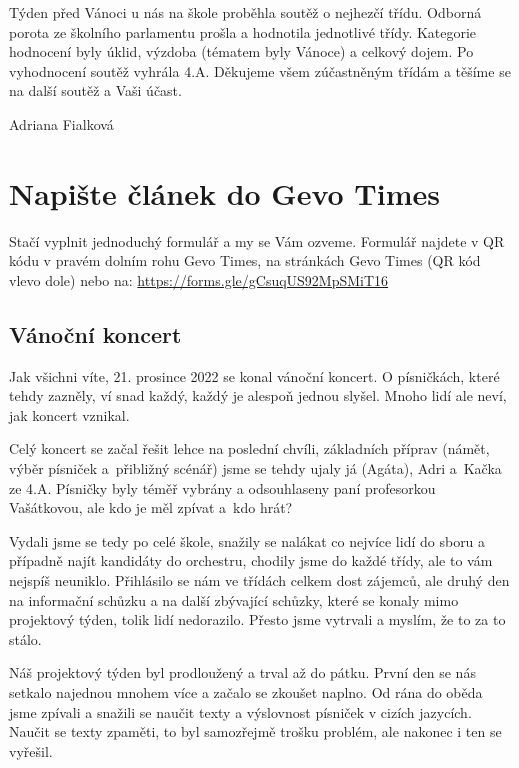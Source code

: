 \documentclass[12pt, a4paper]{article}
\begin{document}
\begin{multicols*}{2}
        Týden před Vánoci u nás na škole proběhla soutěž o nejhezčí třídu. Odborná porota ze školního parlamentu prošla a hodnotila jednotlivé třídy. Kategorie hodnocení byly úklid, výzdoba (tématem byly Vánoce) a celkový dojem. Po vyhodnocení soutěž vyhrála 4.A. Děkujeme všem zúčastněným třídám a těšíme se na další soutěž a Vaši účast.

        \begin{flushright}
			\footnotesize 
            Adriana Fialková
		\end{flushright}

        \section*{Napište článek do Gevo Times}

        \hspace{\parindent} Stačí vyplnit jednoduchý formulář a my se Vám ozveme. Formulář najdete v QR kódu v pravém dolním rohu Gevo Times, na stránkách Gevo Times (QR kód vlevo dole) nebo na: \url{https://forms.gle/gCsuqUS92MpSMiT16}
        \begin{center}\section*{Vánoční koncert}\end{center}

        Jak všichni víte, 21. prosince 2022 se konal vánoční koncert. O písničkách, které tehdy zazněly, ví snad každý, každý je alespoň jednou slyšel. Mnoho lidí ale neví, jak koncert vznikal.

        Celý koncert se začal řešit lehce na poslední chvíli, základních příprav (námět, výběr písniček a~přibližný scénář) jsme se tehdy ujaly já (Agáta), Adri a~Kačka ze 4.A. Písničky byly téměř vybrány a odsouhlaseny paní profesorkou Vašátkovou, ale kdo je měl zpívat a~kdo hrát?

        Vydali jsme se tedy po celé škole, snažily se nalákat co nejvíce lidí do sboru a případně najít kandidáty do orchestru, chodily jsme do každé třídy, ale to vám nejspíš neuniklo. Přihlásilo se nám ve třídách celkem dost zájemců, ale druhý den na informační schůzku a na další zbývající schůzky, které se konaly mimo projektový týden, tolik lidí nedorazilo. Přesto jsme vytrvali a myslím, že to za to stálo.

        Náš projektový týden byl prodloužený a trval až do pátku. První den se nás setkalo najednou mnohem více a začalo se zkoušet naplno. Od rána do oběda jsme zpívali a snažili se naučit texty a výslovnost písniček v cizích jazycích. Naučit se texty zpaměti, to byl samozřejmě trošku problém, ale nakonec i ten se vyřešil.


\end{multicols*}
\end{document}

